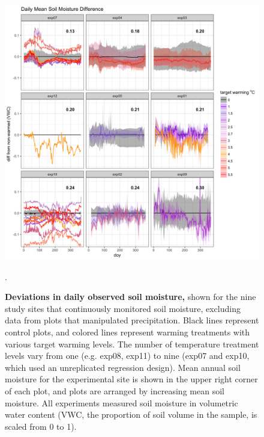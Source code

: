 \documentclass{article}
\begin{document}
 \begin{figure}[h]
    \centering
 \includegraphics{../Analyses/figures/WarmingEffects_TimeSeries_SoilMoist_Deviation_NoPrecip.png}  
 \caption{\textbf{Deviations in daily observed soil moisture,} shown for the nine study sites that continuously monitored soil moisture, excluding data from plots that manipulated precipitation. Black lines represent control plots, and colored lines represent warming treatments with various target warming levels. The number of temperature treatment levels vary from one (e.g. exp08, exp11) to nine (exp07 and exp10, which used an unreplicated regression design). Mean annual soil moisture for the experimental site is shown in the upper right corner of each plot, and plots are arranged by increasing mean soil moisture. All experiments measured soil moisture in volumetric water content (VWC, the proportion of soil volume in the sample, is scaled from 0 to 1).}. 
 \label{fig:mois}
 \end{figure}
\end{document}

